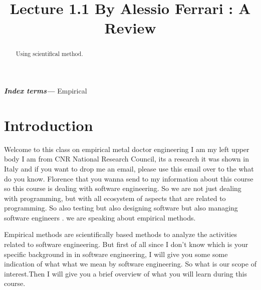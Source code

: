 \documentclass[conference, compsoc, twoside]{IEEEtran}
\begin{document}
\preto\tabular{\setcounter{magicrownumbers}{0}}
\newcommand\rownumber{\stepcounter{magicrownumbers}\arabic{magicrownumbers}}
\title{\Huge Lecture 1.1 By Alessio Ferrari : A Review}
\author{
}

\maketitle
\providecommand{\keywords}[1]{\textbf{\textit{Index terms---}} #1}
\begin{abstract}
Using scientifical method.
\end{abstract}

\keywords{Empirical}
\IEEEpeerreviewmaketitle

\section{Introduction}
Welcome to this class on empirical metal doctor engineering I am my left upper body I am from CNR National Research Council, its a research it was shown in Italy and if you want to drop me an email, please use this email over to the what do you know.
Florence that you wanna send to my information about this course so this course is dealing with software engineering.
So we are not just dealing with programming, but with all ecosystem of aspects that are related to programming.
So also testing but also designing software but also managing software engineers .
we are speaking about empirical methods.

Empirical methods are scientifically based methods to analyze the activities related to software engineering. 
But first of all since I don't know which is your specific background in in software engineering, 
I will give you some some indication of what what we mean by software engineering.
So what is our scope of interest.Then I will give you a brief overview of what you will learn during this course.
\end{document}
